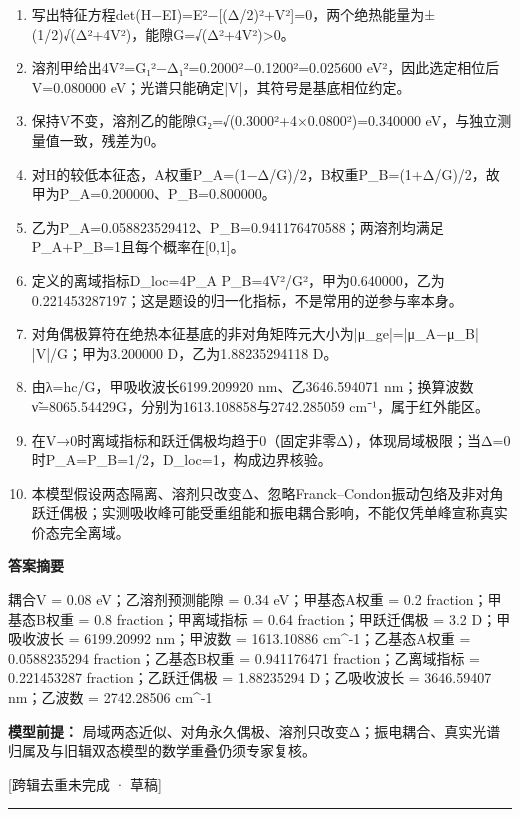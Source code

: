 \documentclass[UTF8,11pt,a4paper]{ctexart}
\begin{document}
\begin{enumerate}
\item 写出特征方程det(H−EI)=E²−[(Δ/2)²+V²]=0，两个绝热能量为±(1/2)√(Δ²+4V²)，能隙G=√(Δ²+4V²)>0。
\item 溶剂甲给出4V²=G₁²−Δ₁²=0.2000²−0.1200²=0.025600 eV²，因此选定相位后V=0.080000 eV；光谱只能确定|V|，其符号是基底相位约定。
\item 保持V不变，溶剂乙的能隙G₂=√(0.3000²+4×0.0800²)=0.340000 eV，与独立测量值一致，残差为0。
\item 对H的较低本征态，A权重P\_A=(1−Δ/G)/2，B权重P\_B=(1+Δ/G)/2，故甲为P\_A=0.200000、P\_B=0.800000。
\item 乙为P\_A=0.058823529412、P\_B=0.941176470588；两溶剂均满足P\_A+P\_B=1且每个概率在[0,1]。
\item 定义的离域指标D\_loc=4P\_A P\_B=4V²/G²，甲为0.640000，乙为0.221453287197；这是题设的归一化指标，不是常用的逆参与率本身。
\item 对角偶极算符在绝热本征基底的非对角矩阵元大小为|μ\_ge|=|μ\_A−μ\_B| |V|/G；甲为3.200000 D，乙为1.88235294118 D。
\item 由λ=hc/G，甲吸收波长6199.209920 nm、乙3646.594071 nm；换算波数ν̃=8065.54429G，分别为1613.108858与2742.285059 cm⁻¹，属于红外能区。
\item 在V→0时离域指标和跃迁偶极均趋于0（固定非零Δ），体现局域极限；当Δ=0时P\_A=P\_B=1/2，D\_loc=1，构成边界核验。
\item 本模型假设两态隔离、溶剂只改变Δ、忽略Franck–Condon振动包络及非对角跃迁偶极；实测吸收峰可能受重组能和振电耦合影响，不能仅凭单峰宣称真实价态完全离域。
\end{enumerate}
\noindent\textbf{答案摘要}\par
耦合V = 0.08 eV；乙溶剂预测能隙 = 0.34 eV；甲基态A权重 = 0.2 fraction；甲基态B权重 = 0.8 fraction；甲离域指标 = 0.64 fraction；甲跃迁偶极 = 3.2 D；甲吸收波长 = 6199.20992 nm；甲波数 = 1613.10886 cm\textasciicircum{}-1；乙基态A权重 = 0.0588235294 fraction；乙基态B权重 = 0.941176471 fraction；乙离域指标 = 0.221453287 fraction；乙跃迁偶极 = 1.88235294 D；乙吸收波长 = 3646.59407 nm；乙波数 = 2742.28506 cm\textasciicircum{}-1\par
\noindent\textbf{模型前提：}
局域两态近似、对角永久偶极、溶剂只改变Δ；振电耦合、真实光谱归属及与旧辑双态模型的数学重叠仍须专家复核。\par
\noindent\textcolor{red!65!black}{[跨辑去重未完成 · 草稿]} \par
\medskip\hrule\medskip
{}
\end{document}
